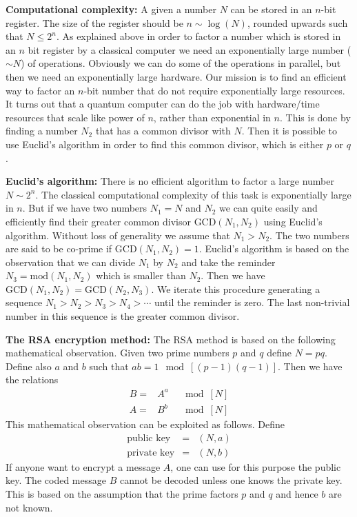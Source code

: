 \documentclass[onecolumn,fleqn, 11pt]{revtex4}
\newcommand{\beq}{\begin{eqnarray}}
\newcommand{\eeq}{\end{eqnarray}}
\begin{document}
{\bf Computational complexity:}
A given a number $N$ can be stored in an $n$-bit 
register. The size of the register should be 
$n \sim \log(N)$, rounded upwards such that $N \le 2^n$. 
As explained above in order to factor a number 
which is stored in an $n$ bit register by a classical computer 
we need an exponentially large number ($\sim N$) 
of operations. Obviously we can do some of the operations 
in parallel, but then we need an exponentially 
large hardware. Our mission is to find an efficient 
way to factor an $n$-bit number that do not 
require exponentially large resources. It turns
out that a quantum computer can do the job 
with hardware/time resources that scale like 
power of $n$, rather than exponential in $n$.      
This is done by finding a number $N_2$ that has a common 
divisor with $N$. Then it is possible to use 
Euclid's algorithm in order to find this common 
divisor, which is either $p$ or $q$.


{\bf Euclid's algorithm:}
There is no efficient algorithm to factor a large 
number ${N \sim 2^n}$. The classical computational 
complexity of this task is exponentially large in $n$. 
But if we have two numbers $N_1=N$ and $N_2$ we can quite 
easily and efficiently find their greater common divisor ${\mbox{GCD}(N_1,N_2)}$ 
using Euclid's algorithm.  
Without loss of generality we assume that ${N_1>N_2}$.  
The two numbers are said to be co-prime if ${\mbox{GCD}(N_1,N_2)=1}$.      
Euclid's algorithm is based on the observation that 
we can divide $N_1$ by $N_2$ and take 
the reminder ${N_3=\mbox{mod}(N_1,N_2)}$ 
which is smaller than $N_2$. 
Then we have ${\mbox{GCD}(N_1,N_2)=\mbox{GCD}(N_2,N_3)}$. 
We iterate this procedure generating a sequence 
${N_1>N_2>N_3>N_4>\cdots}$ until the reminder is zero.  
The last non-trivial number in this sequence 
is the greater common divisor. 


{\bf The RSA encryption method:}
The RSA method is based on the following mathematical observation. 
Given two prime numbers $p$ and $q$ define $N=pq$. 
Define also $a$ and $b$ such that ${ab=1 \mod[(p-1)(q-1)]}$. 
Then we have the relations
\beq
B =&  A^a & \ \mod[N] \\
A =&  B^b & \ \mod[N] 
\eeq  
This mathematical observation can be exploited as follows. 
Define
\beq
\mbox{public key} &=& (N,a) \\
\mbox{private key} &=& (N,b) 
\eeq  
If anyone want to encrypt a message $A$, 
one can use for this purpose the public key. 
The coded message $B$ cannot be decoded 
unless one knows the private key. 
This is based on the assumption that 
the prime factors $p$ and $q$ and hence $b$ 
are not known.    
\end{document}
